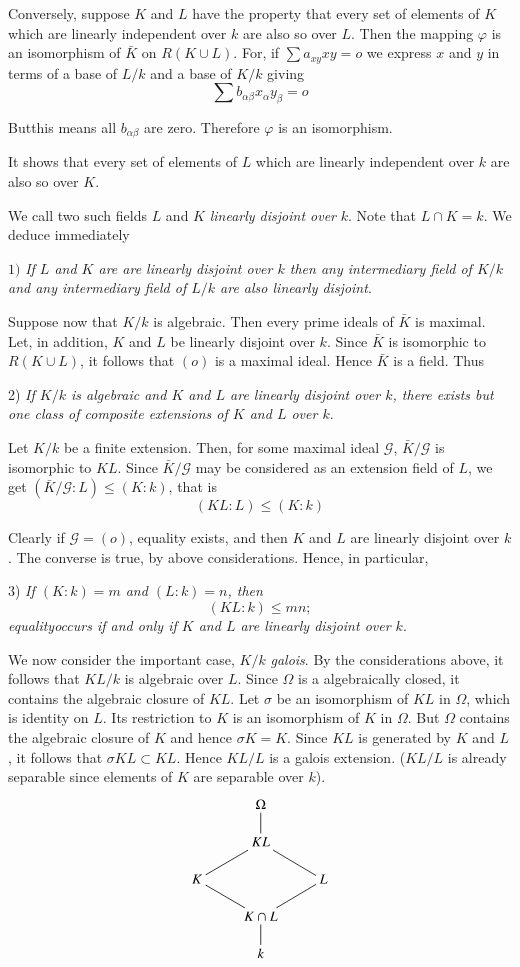 Conversely, suppose $K$ and $L$ have the property that every set of
elements of $K$ which are linearly independent over $k$ are also so
over $L$. Then the mapping $\varphi$ is an isomorphism of $\bar{K}$ on
$R(K  \cup  L)$. For, if $\sum a_{xy}  x  y = o $ we express $x$ and
$y$ in terms of a base of $L/k$ and a base of $K/k$ giving 
$$
\sum b_{\alpha \beta}  x_\alpha  y_\beta = o
$$

But\pageoriginale this means all $b_{\alpha\beta}$ are zero. Therefore
$\varphi$ is an isomorphism.  

It shows that every set of elements of $L$ which are linearly
independent over $k$ are also so over $K$. 

We call two such fields $L$ and $K$ \textit{linearly disjoint over}
$k$. Note that $L  \cap  K = k$. We deduce immediately 

$1)$ \textit{If $L$ and $K$ are are linearly disjoint over $k$ then
  any intermediary field of $K/k$ and any intermediary field of $L/k$
  are also linearly disjoint}. 


Suppose now that $K/k$ is algebraic. Then every prime ideals of
$\bar{K}$ is maximal. Let, in addition, $K$ and $L$ be linearly
disjoint over $k$. Since $\bar{K}$ is isomorphic to $R(K  \cup  L)$,
it follows that $(o)$ is a maximal ideal. Hence $\bar{K}$ is a
field. Thus 

2) \textit{If $K/k$ is algebraic and $K$ and $L$ are linearly disjoint
  over $k$, there exists but one class of composite extensions of $K$
  and $L$ over $k$}. 

Let $K/k$  be a finite extension. Then, for some maximal ideal
$\mathscr{G}$, $\bar{K}/\mathscr{G}$ is isomorphic to $KL$. Since
$\bar{K}/\mathscr{G}$ may be considered as an extension field of $L$,
we get $(\bar{K}/\mathscr{G} : L) \le (K : k)$, that is  
$$
(KL : L) \le (K : k)
$$

Clearly if $\mathscr{G} = (o)$, equality exists, and then $K$ and $L$
are linearly disjoint over $k$. The converse is true, by above
considerations. Hence, in particular, 

3) \textit{If $(K : k) = m$ and $(L : k) = n$, then
$$
(KL : k) \le mn;
$$
equality\pageoriginale occurs if and only if $K$ and $L$ are linearly
disjoint over $k$}.  

We now consider the important case, $K/k$ \textit{galois}. By the
considerations above, it follows that $KL/k$ is algebraic over
$L$. Since $\Omega$ is a algebraically closed, it contains the
algebraic closure of $KL$. Let $\sigma$ be an isomorphism of $KL$ in
$\Omega$, which is identity on $L$. Its restriction to $K$ is an
isomorphism of $K$ in $\Omega$. But $\Omega$ contains the algebraic
closure of $K$ and hence $\sigma K = K$. Since $KL$ is generated by
$K$ and $L$, it follows that $\sigma  KL  \subset  KL$. Hence $KL/L$
is a galois extension. ($KL/L$ is already separable since elements of
$K$ are separable over $k$). 
\[
\xymatrix@R=0.5cm{
& \Omega \ar@{-}[d] & \\
& KL\ar@{-}[dl] \ar@{-}[dr] & \\
K \ar@{-}[dr] & & L \ar@{-}[dl]\\
& K\cap L \ar@{-}[d]&  \\
& k & 
}
\]

